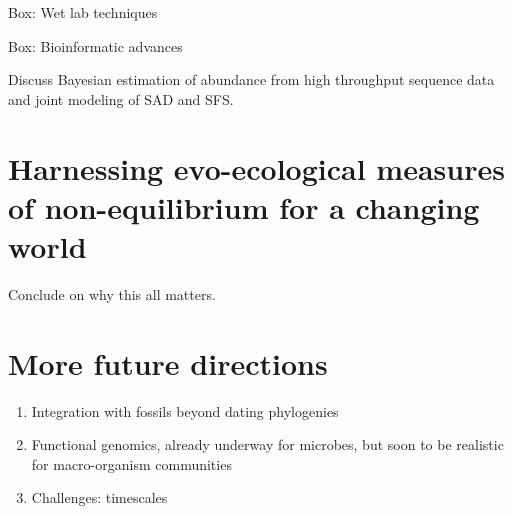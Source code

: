 \documentclass[12pt]{article}
\begin{document}
Box: Wet lab techniques

Box: Bioinformatic advances

Discuss Bayesian estimation of abundance from high throughput sequence
data and joint modeling of SAD and SFS.

\section{Harnessing evo-ecological measures of non-equilibrium for a changing world}

Conclude on why this all matters.

\section{More future directions}

\begin{enumerate}
\item Integration with fossils beyond dating phylogenies
\item Functional genomics, already underway for microbes, but soon to
  be realistic for macro-organism communities
\item Challenges: timescales
\end{enumerate}



\end{document}
